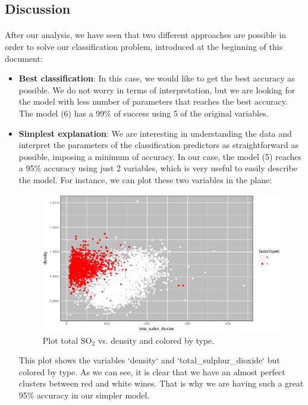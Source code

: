 \documentclass[10pt]{article}
\begin{document}
\subsection{Discussion}

\paragraph*{}
After our analysis, we have seen that two different approaches are possible in order to solve our classification problem, introduced at the beginning of this document:

\begin{itemize}
	\item \textbf{Best classification}: In this case, we would like to get the best accuracy as possible. We do not worry in terms of interpretation, but we are looking for the model with less number of parameters that reaches the best accuracy. The model (6) has a 99\% of success using 5 of the original variables. 
	\item \textbf{Simplest explanation}: We are interesting in understanding the data and interpret the parameters of the classification predictors as straightforward as possible, imposing a minimum of accuracy. In our case, the model (5) reaches a 95\% accuracy using just 2 variables, which is very useful to easily describe the model. For instance, we can plot these two variables in the plane:
	
	\begin{figure}[H]
		\centering
		\includegraphics[width=5in]{figures/cluster.png} 
		\caption{Plot total SO$_2$ vs. density and colored by type.}
		\label{figure:cluster}
	\end{figure}
	
	This plot shows the variables `density` and `total\_sulphur\_dioxide` but colored by type. As we can see, it is clear that we have an almost perfect clusters between red and white wines. That is why we are having such a great 95\% accuracy in our simpler model. 
\end{itemize}
\end{document}
